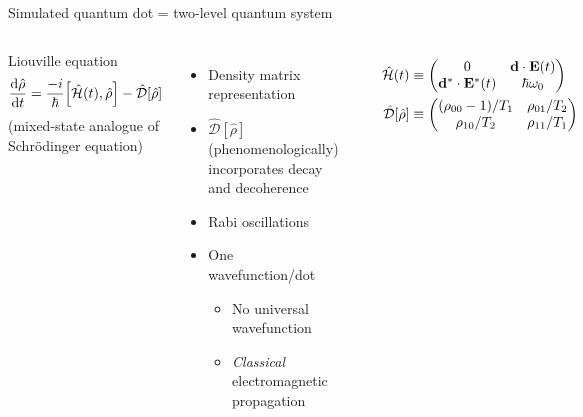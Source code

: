 \documentclass[aspectratio=169, usenames, dvipsnames]{beamer}
\begin{document}
\begin{frame}{Simulated quantum dot = two-level quantum system}
  \begin{columns}
      \begin{block}{Liouville equation}
        \begin{equation*}
          \dv{\hat{\rho}}{t} = \frac{-i}{\hbar} \commutator{\hat{\mathcal{H}}(t)}{\hat{\rho}} - \hat{\mathcal{D}}\qty[\hat{\rho}]
        \end{equation*}
        \hfill {\tiny(mixed-state analogue of Schr\"odinger equation)}
      \end{block}

      \begin{itemize}
        \item Density matrix representation
        \item $\hat{\mathcal{D}}[\hat{\rho}]$ (phenomenologically) incorporates decay and decoherence
        \item Rabi oscillations
        \item One wavefunction/dot
          \begin{itemize}
            \item No universal wavefunction
            \item \emph{Classical} electromagnetic propagation
          \end{itemize}
      \end{itemize}

      \begin{center}
        
      \end{center}

      \vspace{-1.0cm}
      \begin{align*}
        \hat{\mathcal{H}}(t) &\equiv \mqty(0 & \vb{d} \cdot \vb{E}(t) \\ \vb{d}^* \cdot \vb{E}^*(t) & \hbar \omega_0) \\
        \hat{\mathcal{D}}[\hat{\rho}] &\equiv \mqty( (\rho_{00} - 1)/T_1 & \rho_{01}/T_2 \\ \rho_{10}/T_2 & \rho_{11}/T_1)
      \end{align*}
  \end{columns}
\end{frame}
\end{document}
